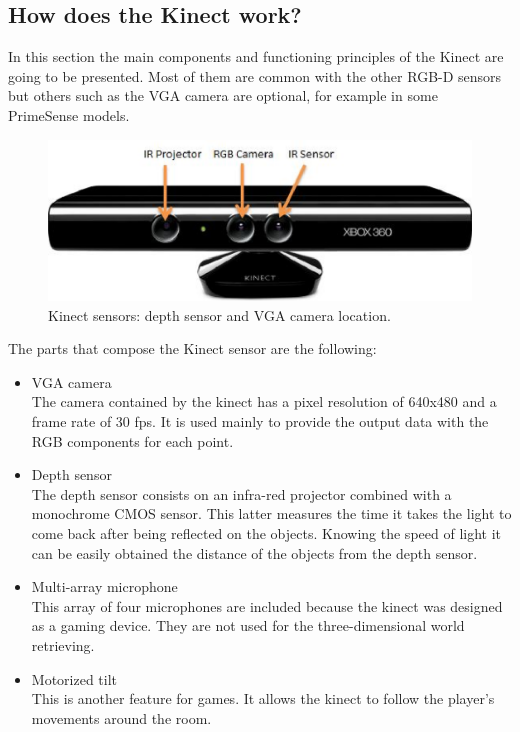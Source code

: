 \subsection{How does the Kinect work?}
In this section the main components and functioning principles of the Kinect are going to be presented. Most of them are common with the other RGB-D sensors but others such as the VGA camera are optional, for example in some PrimeSense\cite{PrimeSense} models. 



\begin{figure}[h]
	\begin{center}
\includegraphics[scale=0.5]{img/kinect/kinect2.eps}
	\caption[Kinect Sensors]{Kinect sensors: depth sensor and VGA camera location.}
	\end{center}
\end{figure}


The parts that compose the Kinect sensor are the following: 

\begin{itemize}
	\item{VGA camera}\\
	The camera contained by the kinect has a pixel resolution of 640x480 and a frame rate of 30 fps. It is used mainly to provide the output data with the RGB components for each point. 
	
	\item{Depth sensor}\\
	The depth sensor consists on an infra-red projector combined with a monochrome CMOS sensor. This latter measures the time it takes the light to come back after being reflected on the objects. Knowing the speed of light it can be easily obtained the distance of the objects from the depth sensor. 

	\item{Multi-array microphone}\\
	This array of four microphones are included because the kinect was designed as a gaming device. They are not used for the three-dimensional world retrieving. 
	
	\item{Motorized tilt}\\
	This is another feature for games. It allows the kinect to follow the player's movements around the room. \cite{howkinectworks}
\end{itemize}



